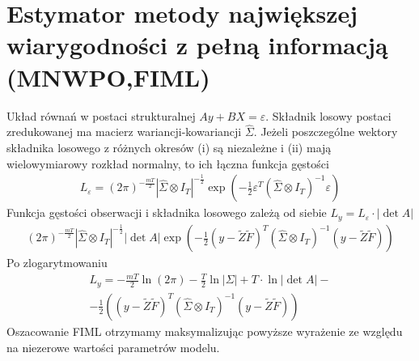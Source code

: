 \section{Estymator metody największej wiarygodności z pełną informacją (MNWPO,FIML)}
Układ równań w postaci strukturalnej $ Ay+BX=\varepsilon $. Składnik losowy postaci zredukowanej ma macierz wariancji-kowariancji $ \hat \Sigma $. Jeżeli poszczególne wektory składnika losowego z różnych okresów (i) są niezależne i (ii) mają wielowymiarowy rozkład normalny, to ich łączna funkcja gęstości
\begin{gather*}
L_\varepsilon=\left(2\pi \right)^{-\frac{mT}{2}}\left|\hat \Sigma \otimes I_T\right|^{-\frac{1}{2}}\exp \left(-\tfrac{1}{2}\varepsilon^T\left(\hat\Sigma\otimes I_T\right)^{-1}\varepsilon\right)
\end{gather*}
Funkcja gęstości obserwacji i składnika losowego zależą od siebie $ L_y=L_\varepsilon\cdot \left|\det A\right| $
\begin{gather*}
\left(2\pi \right)^{-\frac{mT}{2}}\left|\hat \Sigma \otimes I_T\right|^{-\frac{1}{2}}
\left|\det A\right|
\exp\left(-\tfrac{1}{2}\left(y-\tilde{Z}\tilde{F}\right)^T\left(\hat \Sigma\otimes I_T\right)^{-1}\left(y-\tilde{Z}\tilde{F}\right)\right)
\end{gather*}
Po zlogarytmowaniu
\begin{gather*}
L_y=-\tfrac{mT}{2}\ln (2\pi)-\tfrac{T}{2}\ln \left|\Sigma\right|+T\cdot\ln\left|\det A\right|
-\\-
\frac{1}{2}
\left(\left(y-\tilde{Z}\tilde{F}\right)^T\left(\hat \Sigma\otimes I_T\right)^{-1}\left(y-\tilde{Z}\tilde{F}\right)\right)
\end{gather*}
Oszacowanie FIML otrzymamy maksymalizując powyższe wyrażenie ze względu na niezerowe wartości parametrów modelu.
